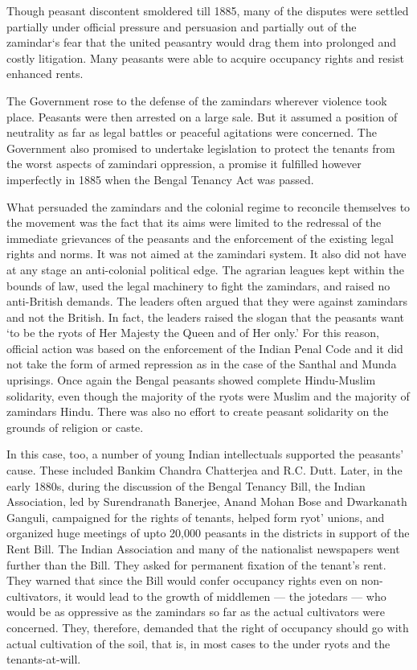 \begin{multicols}{2}
Though peasant discontent smoldered till 1885, many of the disputes were settled partially under official pressure and persuasion and partially out of the zamindar`s fear that the united peasantry would drag them into prolonged and costly litigation. Many peasants were able to acquire occupancy rights and resist enhanced rents.

The Government rose to the defense of the zamindars wherever violence took place. Peasants were then arrested on a large sale. But it assumed a position of neutrality as far as legal battles or peaceful agitations were concerned. The Government also promised to undertake legislation to protect the tenants from the worst aspects of zamindari oppression, a promise it fulfilled however imperfectly in 1885 when the Bengal Tenancy Act was passed.

What persuaded the zamindars and the colonial regime to reconcile themselves to the movement was the fact that its aims were limited to the redressal of the immediate grievances of the peasants and the enforcement of the existing legal rights and norms. It was not aimed at the zamindari system. It also did not have at any stage an anti-colonial political edge. The agrarian leagues kept within the bounds of law, used the legal machinery to fight the zamindars, and raised no anti-British demands. The leaders often argued that they were against zamindars and not the British. In fact, the leaders raised the slogan that the peasants want `to be the ryots of Her Majesty the Queen and of Her only.' For this reason, official action was based on the enforcement of the Indian Penal Code and it did not take the form of armed repression as in the case of the Santhal and Munda uprisings. Once again the Bengal peasants showed complete Hindu-Muslim solidarity, even though the majority of the ryots were Muslim and the majority of zamindars Hindu. There was also no effort to create peasant solidarity on the grounds of religion or caste.

In this case, too, a number of young Indian intellectuals supported the peasants' cause. These included Bankim Chandra Chatterjea and R.C. Dutt. Later, in the early 1880s, during the discussion of the Bengal Tenancy Bill, the Indian Association, led by Surendranath Banerjee, Anand Mohan Bose and Dwarkanath Ganguli, campaigned for the rights of tenants, helped form ryot' unions, and organized huge meetings of upto 20,000 peasants in the districts in support of the Rent Bill. The Indian Association and many of the nationalist newspapers went further than the Bill. They asked for permanent fixation of the tenant's rent. They warned that since the Bill would confer occupancy rights even on non-cultivators, it would lead to the growth of middlemen --- the jotedars --- who would be as oppressive as the zamindars so far as the actual cultivators were concerned. They, therefore, demanded that the right of occupancy should go with actual cultivation of the soil, that is, in most cases to the under ryots and the tenants-at-will.


\end{multicols}
